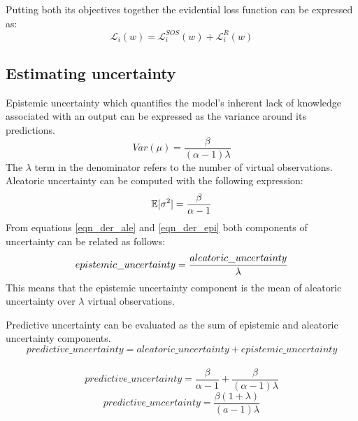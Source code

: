 	Putting both its objectives together the evidential loss function can be expressed as:
	\begin{equation}
		\mathcal{L}_i(w) = \mathcal{L}_i^{SOS}(w) + \mathcal{L}_{i}^R(w)
	\end{equation}
	
	\subsection{Estimating uncertainty}
	Epistemic uncertainty which quantifies the model's inherent lack of knowledge associated with an output can be expressed as the variance around its predictions.
	\begin{equation}\label{eqn_der_epi}
		Var(\mu) = \frac{\beta}{(\alpha - 1)\lambda}
	\end{equation}
	The $\lambda$ term in the denominator refers to the number of virtual observations.
	Aleatoric uncertainty can be computed with the following expression:
	\begin{equation}\label{eqn_der_ale}
		\centering
		\mathbb{E}[\sigma^2]=\frac{\beta}{\alpha -1}
	\end{equation}
	From equations \ref{eqn_der_ale} and \ref{eqn_der_epi} both components of uncertainty can be related as follows:
	\begin{equation}
		\centering
		epistemic\_uncertainty = \frac{aleatoric\_uncertainty}{\lambda}
	\end{equation}
	This means that the epistemic uncertainty component is the mean of aleatoric uncertainty over $\lambda$ virtual observations.
	
	Predictive uncertainty can be evaluated as the sum of epistemic and aleatoric uncertainty components.
	\begin{equation}
		predictive\_uncertainty= aleatoric\_uncertainty + epistemic\_uncertainty
	\end{equation}
	\\
	\begin{equation}
		predictive\_uncertainty= \frac{\beta}{\alpha -1} + \frac{\beta}{(\alpha - 1)\lambda}
	\end{equation}
	\begin{equation}
		predictive\_uncertainty = \frac{\beta(1+\lambda)}{(a-1)\lambda}
	\end{equation}

